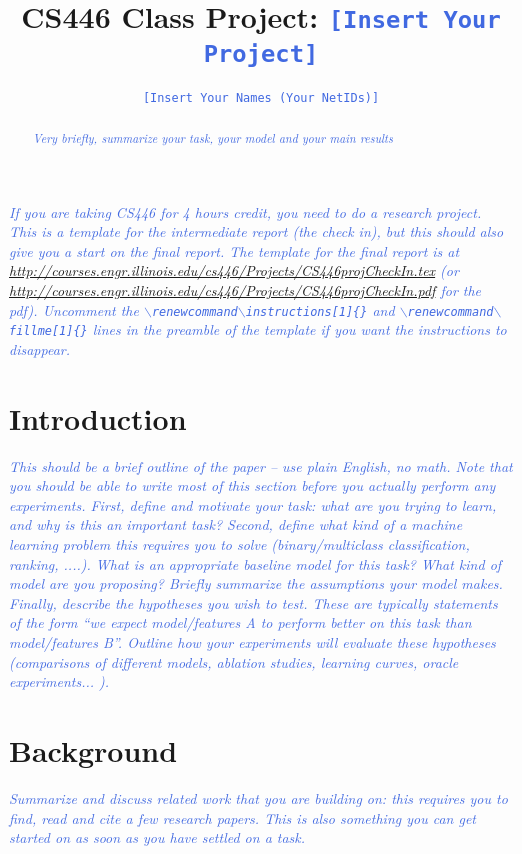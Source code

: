 \documentclass[11pt,letterpaper]{article}
\newcommand{\blue}[1]{\textcolor{RoyalBlue}{#1}}
\newcommand{\fillme}[1]{\blue{\texttt{[Insert #1]}}}
\newcommand{\instructions}[1]{\blue{\textit{#1}}}
\begin{document}
\title{CS446 Class Project: \fillme{Your Project}}
\author{\fillme{Your Names (Your NetIDs)}}
\maketitle



\instructions{If you are taking CS446 for 4 hours credit, you need to
  do a research project. This is a template for the intermediate
  report (the check in),
  but this should also give you a start on the final report.
The template for the final report is at
\url{http://courses.engr.illinois.edu/cs446/Projects/CS446projCheckIn.tex}
(or
\url{http://courses.engr.illinois.edu/cs446/Projects/CS446projCheckIn.pdf}
for the pdf). Uncomment the \texttt{$\backslash$renewcommand{$\backslash$instructions}[1]\{\}}
 and \texttt{$\backslash$renewcommand{$\backslash$fillme}[1]\{\}} lines in the preamble of the template if
 you want the instructions to disappear.
% 
}


\begin{abstract}
\instructions{Very briefly, summarize your task, your model and your main
results} 
\end{abstract}


\section{Introduction} 
\label{sec:introduction}
\instructions{This should be a brief outline of the paper -- use plain English, no math. Note that you should be able to write most of this section before you actually perform any experiments. First, define and motivate your task: what are you trying to learn, and why is this an important task? Second, define what kind of a machine learning problem this requires you to solve (binary/multiclass classification, ranking, ....). What is an appropriate baseline model for this task? What kind of model are you proposing? 
Briefly summarize the assumptions your model makes. Finally, describe the hypotheses you wish to test. These are typically statements of the form ``we expect model/features A to perform better on this task than model/features B''.
Outline how your experiments will evaluate these hypotheses (comparisons of different models, ablation studies, learning curves, oracle experiments... ). }

\section{Background}
\label{sec:background}
\instructions{Summarize and discuss related work that you are building on: this requires you to find, read and cite a few research papers. This is also something you can get started on as soon as you have settled on a task.} 
\end{document}

